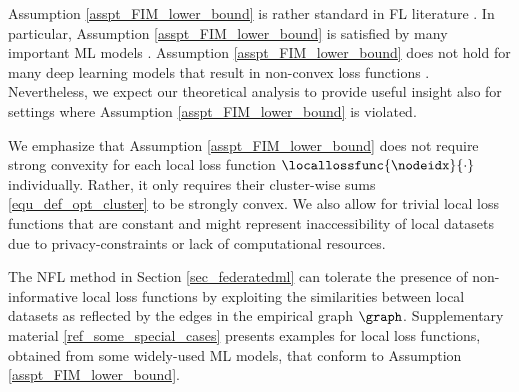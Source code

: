\documentclass[lettersize,journal]{IEEEtran}
\begin{document}
Assumption \ref{asspt_FIM_lower_bound} is rather standard in FL literature \cite{Ghosh2020,Nassif2020}. 
In particular, Assumption \ref{asspt_FIM_lower_bound} is satisfied by many important ML models \cite{LocalizedLinReg2019}. 
Assumption \ref{asspt_FIM_lower_bound} does not hold for many deep learning models that result in 
non-convex loss functions \cite{pmlr-v54-mcmahan17a}. Nevertheless, we expect our theoretical analysis 
to provide useful insight also for settings where Assumption \ref{asspt_FIM_lower_bound} is violated.  


We emphasize that Assumption \ref{asspt_FIM_lower_bound} does not require strong convexity for each local loss 
function $\locallossfunc{\nodeidx}{\cdot}$ individually. Rather, it only requires their cluster-wise sums \eqref{equ_def_opt_cluster} 
to be strongly convex. We also allow for trivial local loss functions that are constant and might represent 
inaccessibility of local datasets due to  privacy-constraints or lack of computational resources. 

The NFL method in Section \ref{sec_federatedml} can tolerate the presence of non-informative local loss functions by exploiting the 
similarities between local datasets as reflected by the edges in the empirical graph $\graph$. Supplementary material \ref{ref_some_special_cases} 
presents examples for local loss functions, obtained from some widely-used ML models, that conform 
to Assumption \ref{asspt_FIM_lower_bound}. %

\end{document}
